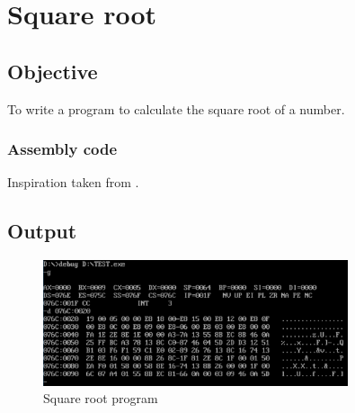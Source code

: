 \section{Square root}

\subsection{Objective}

To write a program to calculate the square root of a number.

\subsubsection{Assembly code}



Inspiration taken from \cite{sqrt}.

\subsection{Output}

\begin{figure}[ht]
    \centering
    \includegraphics[width=0.8\textwidth]{./res/practicals/sqrt.png}
    \caption{Square root program}
    \label{fig:sqrt}
\end{figure}

\pagebreak
